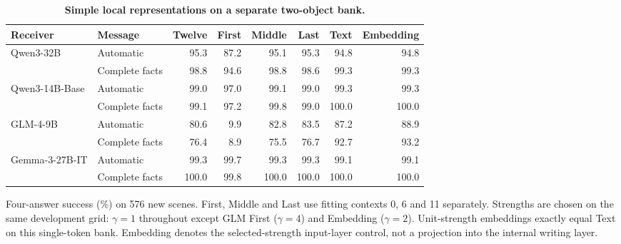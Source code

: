 \begin{table}[H]
\caption{\textbf{Simple local representations on a separate two-object bank.}}
\label{tab:wordif_representations}
\centering\small
\setlength{\tabcolsep}{3pt}\renewcommand{\arraystretch}{1.12}
\begin{tabular*}{\linewidth}{@{\extracolsep{\fill}}llrrrrrr@{}}
\toprule
Receiver & Message & Twelve & First & Middle & Last & Text & Embedding \\
\midrule
Qwen3-32B & Automatic & 95.3 & 87.2 & 95.1 & 95.3 & 94.8 & 94.8 \\
 & Complete facts & 98.8 & 94.6 & 98.8 & 98.6 & 99.3 & 99.3 \\
Qwen3-14B-Base & Automatic & 99.0 & 97.0 & 99.1 & 99.0 & 99.3 & 99.3 \\
 & Complete facts & 99.1 & 97.2 & 99.8 & 99.0 & 100.0 & 100.0 \\
GLM-4-9B & Automatic & 80.6 & 9.9 & 82.8 & 83.5 & 87.2 & 88.9 \\
 & Complete facts & 76.4 & 8.9 & 75.5 & 76.7 & 92.7 & 93.2 \\
Gemma-3-27B-IT & Automatic & 99.3 & 99.7 & 99.3 & 99.3 & 99.1 & 99.1 \\
 & Complete facts & 100.0 & 99.8 & 100.0 & 100.0 & 100.0 & 100.0 \\
\bottomrule
\end{tabular*}
\par\vspace{3pt}
{\footnotesize\raggedright Four-answer success (\%) on 576 new scenes. First, Middle and Last use fitting contexts 0, 6 and 11 separately. Strengths are chosen on the same development grid: $\gamma=1$ throughout except GLM First ($\gamma=4$) and Embedding ($\gamma=2$). Unit-strength embeddings exactly equal Text on this single-token bank. Embedding denotes the selected-strength input-layer control, not a projection into the internal writing layer.\par}
\end{table}
